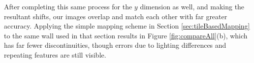 \documentclass[]{spie}  %
\begin{document}
After completing this same process for the $y$ dimension as well, and
making the resultant shifts, our images overlap and match each other
with far greater accuracy. Applying the simple mapping scheme in
Section \ref{sec:tileBasedMapping} to the same wall used in that
section results in Figure \ref{fig:compareAll}(b), which has far fewer
discontinuities, though errors due to lighting differences and
repeating features are still visible.

\end{document}
